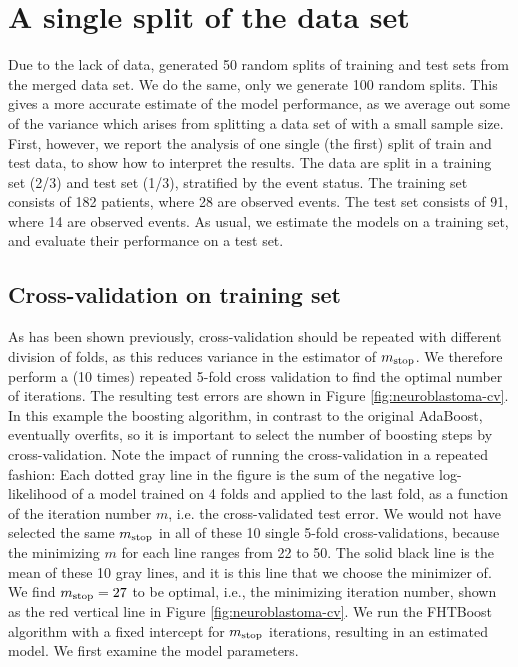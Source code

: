 \section{A single split of the data set}
Due to the lack of data, \citet{bovelstad2009} generated 50 random splits of training and test sets from the merged data set.
We do the same, only we generate 100 random splits.
This gives a more accurate estimate of the model performance, as we average out some of the variance which arises from splitting a data set of with a small sample size.
First, however, we report the analysis of one single (the first) split of train and test data, to show how to interpret the results.
The data are split in a training set (2/3) and test set (1/3), stratified by the event status.
The training set consists of 182 patients, where 28 are observed events.
The test set consists of 91, where 14 are observed events.
As usual, we estimate the models on a training set, and evaluate their performance on a test set.

\subsection{Cross-validation on training set}
As has been shown previously, cross-validation should be repeated with different division of folds, as this reduces variance in the estimator of $m_{\text{stop}}$.
We therefore perform a (10 times) repeated 5-fold cross validation to find the optimal number of iterations.
The resulting test errors are shown in Figure \ref{fig:neuroblastoma-cv}.
In this example the boosting algorithm, in contrast to the original AdaBoost, eventually overfits, so it is important to select the number of boosting steps by cross-validation.
Note the impact of running the cross-validation in a repeated fashion:
Each dotted gray line in the figure is the sum of the negative log-likelihood of a model trained on 4 folds and applied to the last fold, as a function of the iteration number $m$, i.e. the cross-validated test error.
We would not have selected the same $m_{\text{stop}}$ in all of these 10 single 5-fold cross-validations, because the minimizing $m$ for each line ranges from 22 to 50.
The solid black line is the mean of these 10 gray lines, and it is this line that we choose the minimizer of.
We find $m_{\text{stop}}=27$ to be optimal, i.e., the minimizing iteration number, shown as the red vertical line in Figure \ref{fig:neuroblastoma-cv}.
We run the FHTBoost algorithm with a fixed intercept for $m_{\text{stop}}$ iterations, resulting in an estimated model.
We first examine the model parameters.

